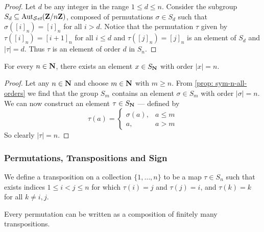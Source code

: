 \begin{proof}
  Let \(d\) be any integer in the range \(1 \leq d \leq n\). Consider the
  subgroup \(S_d \subseteq \operatorname{Aut}_{{\mathcal{S}\textit{et}}}(\mathbf{Z}/n\mathbf{Z})\), composed of permutations
  \(\sigma \in S_d\) such that \(\sigma([i]_n) = [i]_n\) for all \(i > d\).
  Notice that the permutation \(\tau\) given by \(\tau([i]_n) = [i + 1]_n\) for
  all \(i \leq d\) and \(\tau([j]_n) = [j]_n\) is an element of \(S_d\) and
  \(|\tau| = d\). Thus \(\tau\) is an element of order \(d\) in \(S_n\).
\end{proof}

\begin{corollary}
  For every \(n \in \mathbf{N}\), there exists an element \(x \in S_{\mathbf{N}}\) with
  order \(|x| = n\).
\end{corollary}

\begin{proof}
  Let any \(n \in \mathbf{N}\) and choose \(m \in \mathbf{N}\) with \(m \geq n\). From
  \cref{prop: sym-n-all-orders} we find that the group \(S_m\) contains
  an element \(\sigma \in S_m\) with order \(|\sigma| = n\). We can now
  construct an element \(\tau \in S_{\mathbf{N}}\) --- defined by
  \[
    \tau(a) =
    \begin{cases}
      \sigma(a), &a \leq m \\
      a, &a > m
    \end{cases}
  \]
  So clearly \(|\tau| = n\).
\end{proof}

\subsubsection{Permutations, Transpositions and Sign}

\begin{definition}[Transposition]
  \label{def: transposition}
  We define a transposition on a collection \(\{1, \dots, n\}\) to be a map
  \(\tau \in S_n\) such that exists indices \(1 \leq i < j \leq n\)
  for which \(\tau(i) = j\) and \(\tau(j) = i\), and \(\tau(k) = k\) for all
  \(k \neq i, j\).
\end{definition}

\begin{proposition}\label{prop: permutations to transpositions}
  Every permutation can be written as a composition of finitely many
  transpositions.
\end{proposition}

